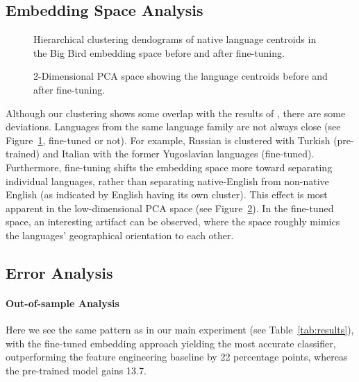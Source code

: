 \documentclass[10pt, a4paper]{article}
\begin{document}
\subsection{Embedding Space Analysis}

\begin{figure}[t]
    \centering
    
    \caption{Hierarchical clustering dendograms of native language centroids in the Big Bird embedding space before and after fine-tuning.}
    \label{fig:language_clustering}
\end{figure}

\begin{figure}[t]
    \centering
    
    \caption{2-Dimensional PCA space showing the language centroids before and after fine-tuning.}
    \label{fig:pca}
\end{figure}

Although our clustering shows some overlap with the results of , there are some deviations. Languages from the same language family are not always close (see Figure~\ref{fig:language_clustering}, fine-tuned or not). For example, Russian is clustered with Turkish (pre-trained) and Italian with the former Yugoslavian languages (fine-tuned). Furthermore, fine-tuning shifts the embedding space more toward separating individual languages, rather than separating native-English from non-native English (as indicated by English having its own cluster). This effect is most apparent in the low-dimensional PCA space (see Figure~\ref{fig:pca}).  In the fine-tuned space, an interesting artifact can be observed, where the space roughly mimics the languages' geographical orientation to each other.


\subsection{Error Analysis}

\paragraph{Out-of-sample Analysis} Here we see the same pattern as in our main experiment (see Table~\ref{tab:results}), with the fine-tuned embedding approach yielding the most accurate classifier, outperforming the feature engineering baseline by 22 percentage points, whereas the pre-trained model gains 13.7.
\end{document}

